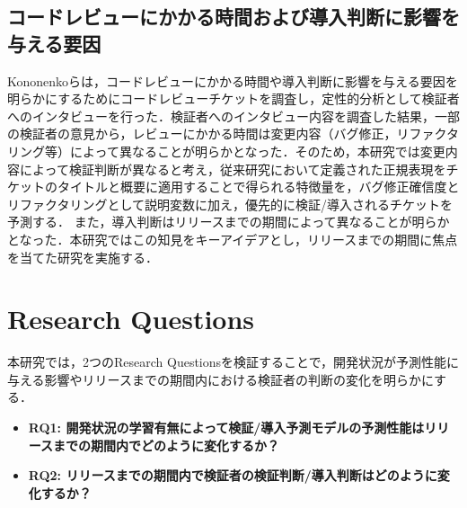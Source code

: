 \documentclass[11pt]{jreport}
\newcommand{\rqone}{開発状況の学習有無によって検証/導入予測モデルの予測性能はリリースまでの期間内でどのように変化するか？}
\newcommand{\rqtwo}{リリースまでの期間内で検証者の検証判断/導入判断はどのように変化するか？}
\begin{document}
\subsection{コードレビューにかかる時間および導入判断に影響を与える要因}
Kononenko\cite{release_merge}らは，コードレビューにかかる時間や導入判断に影響を与える要因を明らかにするためにコードレビューチケットを調査し，定性的分析として検証者へのインタビューを行った．検証者へのインタビュー内容を調査した結果，一部の検証者の意見から，レビューにかかる時間は変更内容（バグ修正，リファクタリング等）によって異なることが明らかとなった．そのため，本研究では変更内容によって検証判断が異なると考え，従来研究\cite{bug}\cite{refactoring}において定義された正規表現をチケットのタイトルと概要に適用することで得られる特徴量を，バグ修正確信度とリファクタリングとして説明変数に加え，優先的に検証/導入されるチケットを予測する．
また，導入判断はリリースまでの期間によって異なることが明らかとなった．本研究ではこの知見をキーアイデアとし，リリースまでの期間に焦点を当てた研究を実施する．


\section{Research Questions}
本研究では，2つのResearch Questionsを検証することで，開発状況が予測性能に与える影響やリリースまでの期間内における検証者の判断の変化を明らかにする．

\begin{itemize}
  \item \textbf{RQ1: \rqone}
  \item \textbf{RQ2: \rqtwo}
\end{itemize}
\end{document}
